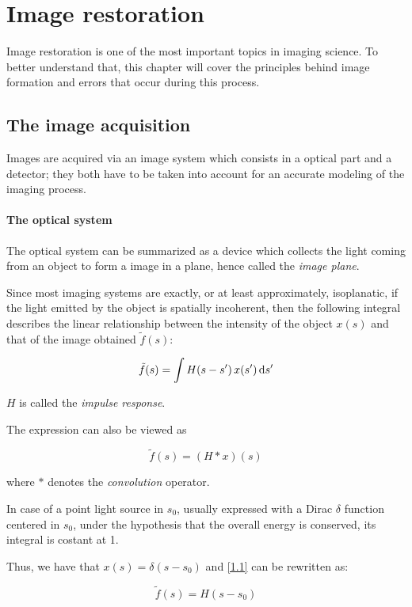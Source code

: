 \chapter{Image restoration} \label{chap1}

Image restoration is one of the most important topics in imaging science. To better understand that, this chapter will cover the principles behind image formation and errors that occur during this process.

\section{The image acquisition}

Images are acquired via an image system which consists in a optical part and a detector; they both have to be taken into account for an accurate modeling of the imaging process.

\subsubsection{The optical system}

The optical system can be summarized as a device which collects the light coming from an object to form a image in a plane, hence called the \emph{image plane}.

Since most imaging systems are exactly, or at least approximately, isoplanatic, if the light emitted by the object is spatially incoherent, then the following integral describes the linear relationship between the intensity of the object $x(s)$ and that of the image obtained $\tilde{f}(s)$:

\begin{align} \label{1.1}
\tilde{f}(s) = \int H(s-s')\, x(s') \, \mathrm{d} s'
\end{align}

$H$ is called the \emph{impulse response}.

The expression can also be viewed as

$$\tilde{f}(s) = (H*x)(s)$$

where $*$ denotes the \emph{convolution} operator.

In case of a point light source in $s_0$, usually expressed with a Dirac $\delta$ function centered in $s_0$, under the hypothesis that the overall energy is conserved, its integral is costant at 1.

Thus, we have that $x(s) = \delta(s-s_0)$ and \eqref{1.1} can be rewritten as:

$$\tilde{f}(s) = H(s-s_0)$$

